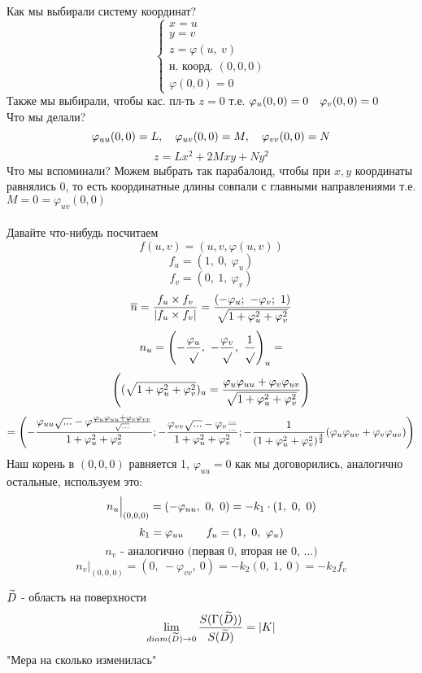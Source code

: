 \documentclass[main]{subfiles}
\begin{document}
    Как мы выбирали систему координат?
    \[\begin{cases}
        x = u\\
        y = v\\
        z = \varphi(u,\ v)\\
        \text{н. коорд. }(0,0,0)\\
        \varphi(0,0) = 0
    \end{cases}\]
    Также мы выбирали, чтобы кас. пл-ть $z=0$
    т.е. $\varphi_u(0,0) = 0 \quad \varphi_v(0,0) = 0 $\\
    Что мы делали?
    \[\varphi_{uu}(0,0) = L,\quad \varphi_{uv}(0,0) = M,\quad \varphi_{vv}(0,0) = N\]
    \[z = Lx^2 + 2 Mxy + Ny^2\]
    Что мы вспоминали? Можем выбрать так парабалоид, чтобы при $x,y$ координаты равнялись 0, то есть координатные длины совпали с главными направлениями
    т.е. $M = 0 = \varphi_{uv}(0,0)$\\ \ \\
    Давайте что-нибудь посчитаем
    \[f(u,v) = (u,v, \varphi(u,v))\]
    \[f_u = (1,\ 0,\ \varphi_u)\]
    \[f_v = (0,\ 1,\ \varphi_v)\]
    \[\overline{n} = \frac{f_u \times f_v}{|f_u \times f_v|} = \frac{(-\varphi_u;\ -\varphi_v;\ 1)}{\sqrt{1 + \varphi_u^2 + \varphi_v^2}}\]
    \[n_u = \left(- \frac{\varphi_u}{\sqrt{}},\
    - \frac{\varphi_v}{\sqrt{}},\
    \frac{1}{\sqrt{}}\right)_u = \]
    \[\left((\sqrt{1 + \varphi_u^2 + \varphi_v^2})_u =
    \frac{\varphi_u \varphi_{uu} + \varphi_v \varphi_{uv}}{\sqrt{1 + \varphi_u^2 + \varphi_v^2}}\right)\]
    \[= \left(-\frac{\varphi_{uu}\sqrt{...} - \varphi \frac{\varphi_u \varphi_{uu} + \varphi_v \varphi_{vv}}{\sqrt{...}}}{1+ \varphi_u^2 + \varphi_v^2};
    - \frac{\varphi_{vv} \sqrt{...} - \varphi_v \frac{...}{...}}{1 + \varphi_u^2 + \varphi_v^2};
    -\frac{1}{(1+ \varphi_u^2 + \varphi_v^2)^{\frac{3}{2}}} (\varphi_u \varphi_{uv} + \varphi_v \varphi_{uv})\right)\]
    Наш корень в $(0,0,0)$ равняется 1, $\varphi_{uu}=0$ как мы договорились, аналогично остальные, используем это:
    \[n_u \Big|_{(0,0,0)} = \left(-\varphi_{uu},\ 0,\ 0\right) = -k_1 \cdot (1,\ 0,\ 0)\]
    \[k_1 = \varphi_{uu} \qquad f_u = (1,\ 0,\ \varphi_u)\]
    \[n_v \text{ - аналогично (первая 0, вторая не 0, ...)}\]
    \[n_v \Big|_{(0,0,0)} = (0,\ -\varphi_{vv},\ 0) = -k_2 (0,\ 1,\ 0) = -k_2 f_v\]

    \begin{theorem}
        $\widetilde{D}$ - область на поверхности
        \[\lim_{diam(\widetilde{D}) \rightarrow 0}\frac{S(\Gamma(\widetilde{D}))}{S(\widetilde{D})} = |K|\]
        "Мера на сколько изменилась"{}
    \end{theorem}
\end{document}
